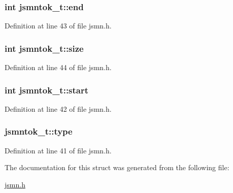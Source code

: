 \subsubsection[{end}]{\setlength{\rightskip}{0pt plus 5cm}int jsmntok\+\_\+t\+::end}\label{structjsmntok__t_ab49e0369f39e9b6174141e7f5bde5996}


Definition at line 43 of file jsmn.\+h.

\hypertarget{structjsmntok__t_a8ac3694b7335456c8e602197778883db}{}
\subsubsection[{size}]{\setlength{\rightskip}{0pt plus 5cm}int jsmntok\+\_\+t\+::size}\label{structjsmntok__t_a8ac3694b7335456c8e602197778883db}


Definition at line 44 of file jsmn.\+h.

\hypertarget{structjsmntok__t_a0a8f55d0095f268ce8e224fe1234acd0}{}
\subsubsection[{start}]{\setlength{\rightskip}{0pt plus 5cm}int jsmntok\+\_\+t\+::start}\label{structjsmntok__t_a0a8f55d0095f268ce8e224fe1234acd0}


Definition at line 42 of file jsmn.\+h.

\hypertarget{structjsmntok__t_ac03dbd6b83cbcd979eb64702d5b9943e}{}
\subsubsection[{type}]{ jsmntok\+\_\+t\+::type}\label{structjsmntok__t_ac03dbd6b83cbcd979eb64702d5b9943e}


Definition at line 41 of file jsmn.\+h.



The documentation for this struct was generated from the following file\+:\begin{DoxyCompactItemize}
\item 
\hyperlink{jsmn_8h}{jsmn.\+h}\end{DoxyCompactItemize}
